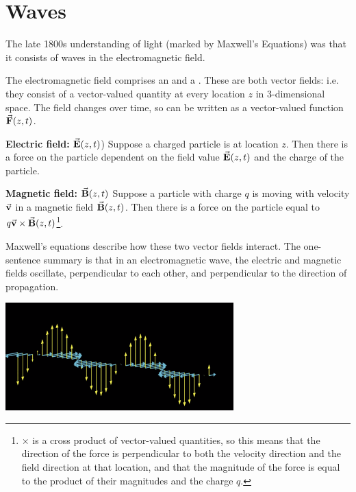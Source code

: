 \section{Waves}

The late 1800s understanding of light (marked by Maxwell's Equations) was that it consists of waves
in the electromagnetic field.

The electromagnetic field comprises an  and a . These are
both vector fields: i.e. they consist of a vector-valued quantity at every location $z$ in
3-dimensional space. The field changes over time, so can be written as a vector-valued function
$\va{F}(z, t)$.

{\bf Electric field:} $\va E(z, t)$) Suppose a charged particle is at location $z$. Then there is a
force on the particle dependent on the field value $\va E(z, t)$ and the charge of the particle.

{\bf Magnetic field:} $\va B(z, t)$ Suppose a particle with charge $q$ is moving with velocity
$\va v$ in a magnetic field $\va B(z, t)$. Then there is a force on the particle equal to
$q\va v \times \va B(z, t)$\footnote{$\times$ is a cross product of vector-valued quantities, so
  this means that the direction of the force is perpendicular to both the velocity direction and the
  field direction at that location, and that the magnitude of the force is equal to the product of
  their magnitudes and the charge $q$.}.

Maxwell's equations describe how these two vector fields interact.  The one-sentence summary is that in an
electromagnetic wave, the electric and magnetic fields oscillate, perpendicular to each other, and
perpendicular to the direction of propagation.

\includegraphics[width=250pt]{img/quantum-waves-1.png}

